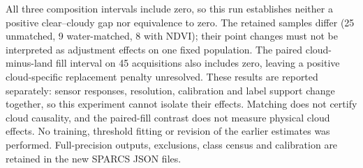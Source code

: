 All three composition intervals include zero, so this run establishes neither a positive clear--cloudy gap nor equivalence to zero. The retained samples differ (25 unmatched, 9 water-matched, 8 with NDVI); their point changes must not be interpreted as adjustment effects on one fixed population. The paired cloud-minus-land fill interval on 45 acquisitions also includes zero, leaving a positive cloud-specific replacement penalty unresolved.
These results are reported separately: sensor responses, resolution, calibration and label support change together, so this experiment cannot isolate their effects. Matching does not certify cloud causality, and the paired-fill contrast does not measure physical cloud effects. No training, threshold fitting or revision of the earlier estimates was performed. Full-precision outputs, exclusions, class census and calibration are retained in the new SPARCS JSON files.
